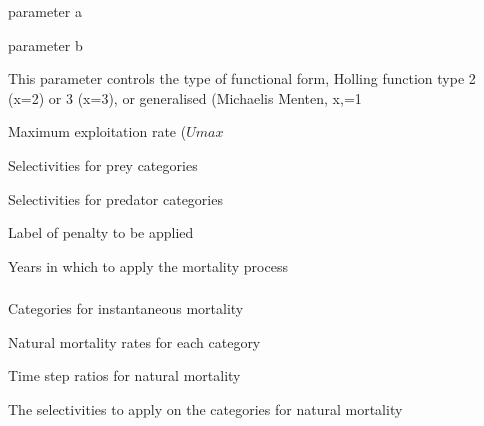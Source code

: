  {parameter a}

 {parameter b}

 {This parameter controls the type of functional form, Holling function type 2 (x=2) or 3 (x=3), or generalised (Michaelis Menten, x,=1}

 {Maximum exploitation rate ($Umax$}

 {Selectivities for prey categories}

 {Selectivities for predator categories}

 {Label of penalty to be applied}

 {Years in which to apply the mortality process}

\subsubsection[Mortality Instantaneous]{}

 {Categories for instantaneous mortality}

 {Natural mortality rates for each category}

 {Time step ratios for natural mortality}

 {The selectivities to apply on the categories for natural mortality}

\subsubsection[Mortality Prey Suitability]{}

